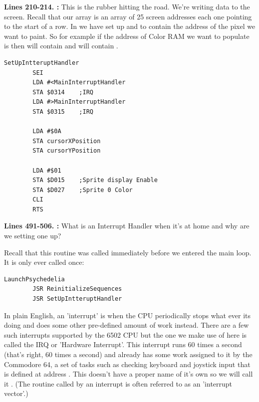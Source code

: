 \textbf{Lines 210-214. :} This is the rubber hitting the road. We're writing data to the
screen. Recall that our   array is an array of 25 screen addresses each one pointing
to the start of a row. In  we have set up  and  to contain the address of the pixel we want to paint. So for example if the address of Color RAM we want to populate
is  then  will contain  and  will
contain . 
\clearpage
\begin{lstlisting}[caption= Setting up our Interrupt Handler]
SetUpIntteruptHandler   
        SEI 
        LDA #<MainInterruptHandler
        STA $0314    ;IRQ
        LDA #>MainInterruptHandler
        STA $0315    ;IRQ

        LDA #$0A
        STA cursorXPosition
        STA cursorYPosition

        LDA #$01
        STA $D015    ;Sprite display Enable
        STA $D027    ;Sprite 0 Color
        CLI 
        RTS 
\end{lstlisting}
\clearpage
{}
\textbf{Lines 491-506. :} What is an Interrupt Handler when it's at home and why are
we setting one up?

Recall that this routine was called immediately before we entered the main loop. It is only ever called once:
\begin{lstlisting}
LaunchPsychedelia   
        JSR ReinitializeSequences
        JSR SetUpIntteruptHandler
\end{lstlisting}

In plain English, an 'interrupt' is when the CPU periodically stops what ever its doing and does some other pre-defined amount
of work instead. There are a few such interrupts supported by the 6502 CPU but the one we make use of here is called the IRQ
or 'Hardware Interrupt'. This interrupt runs 60 times a second (that's right, 60 times a second) and already has some work
assigned to it by the Commodore 64, a set of tasks such as checking keyboard and joystick input that is defined at address .
This doesn't have a proper name of it's own so we will call it . (The routine called by an interrupt
is often referred to as an 'interrupt vector'.)

